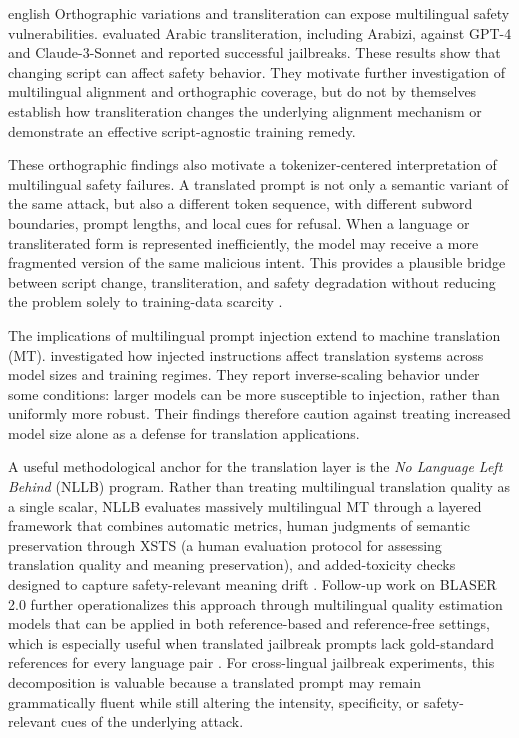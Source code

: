 \begin{otherlanguage*}{english}
Orthographic variations and transliteration can expose multilingual safety vulnerabilities. \textcite{ghanimJailbreakingLLMsArabic2024} evaluated Arabic transliteration, including Arabizi, against GPT-4 and Claude-3-Sonnet and reported successful jailbreaks. These results show that changing script can affect safety behavior. They motivate further investigation of multilingual alignment and orthographic coverage, but do not by themselves establish how transliteration changes the underlying alignment mechanism or demonstrate an effective script-agnostic training remedy.

These orthographic findings also motivate a tokenizer-centered interpretation of multilingual safety failures. A translated prompt is not only a semantic variant of the same attack, but also a different token sequence, with different subword boundaries, prompt lengths, and local cues for refusal. When a language or transliterated form is represented inefficiently, the model may receive a more fragmented version of the same malicious intent. This provides a plausible bridge between script change, transliteration, and safety degradation without reducing the problem solely to training-data scarcity \cite{ghanimJailbreakingLLMsArabic2024,rust2021tokenizer}.

The implications of multilingual prompt injection extend to machine translation (MT). \textcite{sunScalingBehaviorMachine2024a} investigated how injected instructions affect translation systems across model sizes and training regimes. They report inverse-scaling behavior under some conditions: larger models can be more susceptible to injection, rather than uniformly more robust. Their findings therefore caution against treating increased model size alone as a defense for translation applications.

A useful methodological anchor for the translation layer is the \emph{No Language Left Behind} (NLLB) program. Rather than treating multilingual translation quality as a single scalar, NLLB evaluates massively multilingual MT through a layered framework that combines automatic metrics, human judgments of semantic preservation through XSTS (a human evaluation protocol for assessing translation quality and meaning preservation), and added-toxicity checks designed to capture safety-relevant meaning drift \cite{NLLBTeamScalingNeuralMachine2024,lichtConsistentHumanEvaluation2022}. Follow-up work on BLASER 2.0 further operationalizes this approach through multilingual quality estimation models that can be applied in both reference-based and reference-free settings, which is especially useful when translated jailbreak prompts lack gold-standard references for every language pair \cite{daleBLASER2024}. For cross-lingual jailbreak experiments, this decomposition is valuable because a translated prompt may remain grammatically fluent while still altering the intensity, specificity, or safety-relevant cues of the underlying attack.


\end{otherlanguage*}
